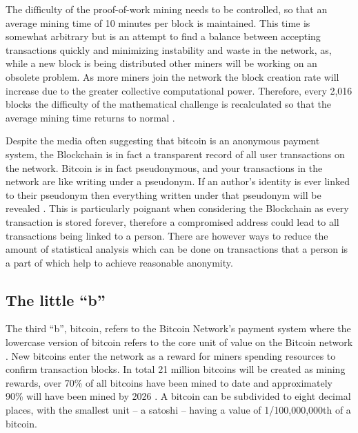 \documentclass{article}
\begin{document}
The difficulty of the proof-of-work mining needs to be controlled, so that an average mining time of 10 minutes per block is maintained. This time is somewhat arbitrary but is an attempt to find a balance between accepting transactions quickly and minimizing instability and waste in the network, as, while a new block is being distributed other miners will be working on an obsolete problem. As more miners join the network the block creation rate will increase due to the greater collective computational power. Therefore, every 2,016 blocks the difficulty of the mathematical challenge is recalculated so that the average mining time returns to normal \citep{20_developer_guide_bitcoin_2016}\citep{26_blockchain_mining_-_distributed_ledgers_and_blockchain_technology_2016}.

Despite the media often suggesting that bitcoin is an anonymous payment system, the Blockchain is in fact a transparent record of all user transactions on the network. Bitcoin is in fact pseudonymous, and your transactions in the network are like writing under a pseudonym. If an author's identity is ever linked to their pseudonym then everything written under that pseudonym will be revealed \citep{28_anonymity_2016}. This is particularly poignant when considering the Blockchain as every transaction is stored forever, therefore a compromised address could lead to all transactions being linked to a person. There are however ways to reduce the amount of statistical analysis which can be done on transactions that a person is a part of which help to achieve reasonable anonymity.

\subsection{The little ``b''}

The third ``b'', bitcoin, refers to the Bitcoin Network's payment system where the lowercase version of bitcoin refers to the core unit of value on the Bitcoin network \citep{9_kaye_scholer_2016}. New bitcoins enter the network as a reward for miners spending resources to confirm transaction blocks. In total 21 million bitcoins will be created as mining rewards, over 70\% of all bitcoins have been mined to date and approximately 90\% will have been mined by 2026 \citep{9_kaye_scholer_2016}. A bitcoin can be subdivided to eight decimal places, with the smallest unit – a satoshi – having a value of 1/100,000,000th of a bitcoin.
\end{document}
